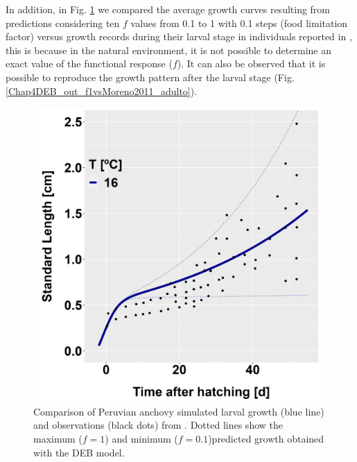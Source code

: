 In addition, in Fig. \ref{Chap4DEB_out_fMaxMin_vsMoreno2011_larva} we compared the average growth curves resulting from predictions considering ten $f$ values from 0.1 to 1 with 0.1 steps (food limitation factor) versus growth records during their larval stage in individuals reported in \cite{MoreClar2011}, this is because in the natural environment, it is not possible to determine an exact value of the functional response ($f$). It can also be observed that it is possible to reproduce the growth pattern after the larval stage (Fig. \ref{Chap4DEB_out_f1vsMoreno2011_adulto}).\\

\begin{figure}[H]
	\includegraphics[width=1.0\textwidth]{figures/Chap4DEB_out_fMaxMin_vsMoreno2011_larva.png}
	\centering
	\caption{Comparison of Peruvian anchovy simulated larval growth (blue line) and observations (black dots) from \cite{MoreClar2011}. Dotted lines show the maximum ($f = 1$) and minimum ($f=0.1$)predicted growth obtained with the DEB model.}
	\label{Chap4DEB_out_fMaxMin_vsMoreno2011_larva}
\end{figure}

